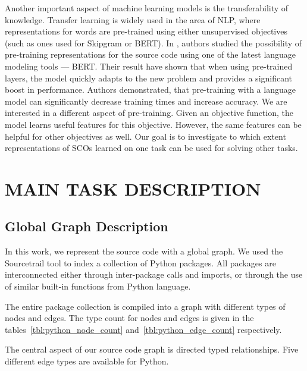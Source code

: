 \documentclass[a4paper,twoside]{article}
\begin{document}
Another important aspect of machine learning models is the transferability of knowledge. Transfer learning is widely used in the area of NLP, where representations for words are pre-trained using either unsupervised objectives (such as ones used for Skipgram or BERT).
In \cite{Kanade2019}, authors studied the possibility of pre-training representations for the source code using one of the latest language modeling tools --- BERT\@. Their result have shown that when using pre-trained layers, the model quickly adapts to the new problem and provides a significant boost in performance. Authors demonstrated, that pre-training with a language model can significantly decrease training times and increase accuracy. We are interested in a different aspect of pre-training. Given an objective function, the model learns useful features for this objective. However, the same features can be helpful for other objectives as well. Our goal is to investigate to which extent representations of SCOs learned on one task can be used for solving other tasks.



\section{\uppercase{Main Task Description}}\label{sec:main}

\subsection{Global Graph Description}

In this work, we represent the source code with a global graph. We used the Sourcetrail tool to index a collection of Python packages. All packages are interconnected either through inter-package calls and imports, or through the use of similar built-in functions from Python language. 

The entire package collection is compiled into a graph with different types of nodes and edges. The type count for nodes and edges is given in the tables~\ref{tbl:python_node_count} and~\ref{tbl:python_edge_count} respectively.

The central aspect of our source code graph is directed typed relationships. Five different edge types are available for Python.
\end{document}
